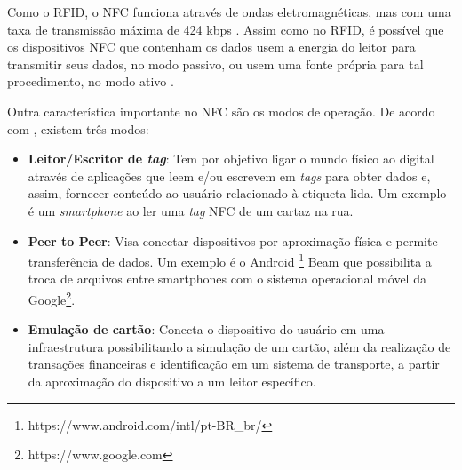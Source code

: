 Como o RFID, o NFC funciona através de ondas eletromagnéticas, mas com uma taxa de transmissão máxima de 424 kbps \cite{NFCForum2016}. Assim como no RFID, é possível que os dispositivos NFC que contenham os dados usem a energia do leitor para transmitir seus dados, no modo passivo, ou usem uma fonte própria para tal procedimento, no modo ativo \cite{Igoe2014}.


Outra característica importante no NFC são os modos de operação. De acordo com , existem três modos:

\begin{itemize} \parskip -1pt
	\item \textbf{Leitor/Escritor de \textit{tag}}: Tem por objetivo ligar o mundo físico ao digital através de aplicações que leem e/ou escrevem em \textit{tags} para obter dados e, assim, fornecer conteúdo ao usuário relacionado à etiqueta lida. Um exemplo é um \textit{smartphone} ao ler uma \textit{tag} NFC de um cartaz na rua.
	\item \textbf{Peer to Peer}: Visa conectar dispositivos por aproximação física e permite transferência de dados. Um exemplo é o Android \textsuperscript{\textregistered}\footnote{https://www.android.com/intl/pt-BR\_br/} Beam que possibilita a troca de arquivos entre smartphones com o 
	sistema operacional móvel da Google\textsuperscript{\textregistered}\footnote{https://www.google.com}.
	\item \textbf{Emulação de cartão}: Conecta o dispositivo do usuário em uma infraestrutura possibilitando a simulação de um cartão, além da realização de transações financeiras e identificação em um sistema de transporte, a partir da aproximação do dispositivo a um leitor 	específico.
\end{itemize}



